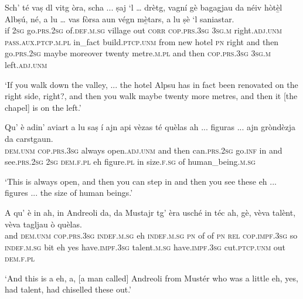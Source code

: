 \begin{linenumbers}
\gll  Sch’ té vaṣ dl vitg òra, scha ... ṣaj `l … drètg, vagní\footnotemark{} gè bagagjau da néiv hòtè̱l Albṣú, né, a lu … vas fòrsa aun végn mè̱tars, a lu ṣè `l\footnotemark{} saniastar.\\
if \textsc{2sg} go.\textsc{prs.2sg} of.\textsc{def.m.sg} village out \textsc{corr} {} \textsc{cop.prs.3sg} \textsc{3sg.m} {} right.\textsc{adj.unm} \textsc{pass.aux.ptcp.m.pl} in\_fact build.\textsc{ptcp.unm} from new hotel \textsc{pn} right and then {} go.\textsc{prs.2sg} maybe moreover twenty metre.\textsc{m.pl} and then \textsc{cop.prs.3sg} \textsc{3sg.m} left.\textsc{adj.unm}\\
\end{linenumbers}
\medskip
\glt `If you walk down the valley, ... the hotel Alpsu has in fact been renovated on the right side, right?, and then you walk maybe twenty more metres, and then it [the chapel] is on the left.'

\medskip

\begin{linenumbers}
\gll  Qu’ è adin' aviart a lu saṣ í ajn api vèzas té quèlas ah ... figuras ... ajn gròndèzja da carstgaun.\\
 \textsc{dem.unm} \textsc{cop.prs.3sg} always open.\textsc{adj.unm} and then can.\textsc{prs.2sg} go.\textsc{inf} in and see.\textsc{prs.2sg} \textsc{2sg} \textsc{dem.f.pl} eh {} figure.\textsc{pl} {} in size.\textsc{f.sg} of human\_being.\textsc{m.sg} \\
\end{linenumbers}
\medskip
\glt `This is always open, and then you can step in and then you see these eh ... figures ... the size of human beings.'
\medskip

\begin{linenumbers}
\gll   A qu’ è in ah, in  Andreoli da, da Mustajr tg’ èra usché in téc ah, gè, vèva talènt, vèva tagljau ò quèlas. \\
and \textsc{dem.unm} \textsc{cop.prs.3sg} \textsc{indef.m.sg} eh \textsc{indef.m.sg} \textsc{pn} of of \textsc{pn} \textsc{rel} \textsc{cop.impf.3sg} so \textsc{indef.m.sg} bit eh yes have.\textsc{impf.3sg} talent.\textsc{m.sg} have.\textsc{impf.3sg} cut.\textsc{ptcp.unm} out \textsc{dem.f.pl}\\
\end{linenumbers}
\medskip
\glt `And this is a eh, a, [a man called] Andreoli from Mustér who was a little eh, yes, had talent, had chiselled these out.'
\medskip

